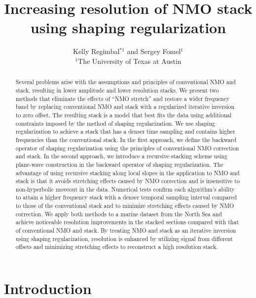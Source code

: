 \title{Increasing resolution of NMO stack using shaping regularization}
\author{Kelly Regimbal$^{*1}$ and Sergey Fomel$^{1}$
\\
$^1$The University of Texas at Austin}

\maketitle


\begin{abstract}
Several problems arise with the assumptions and principles of
conventional NMO and stack, resulting in lower amplitude and lower resolution stacks. We present two methods 
that eliminate the effects of ``NMO stretch'' and restore a wider frequency band by replacing conventional 
NMO and stack with a regularized iterative inversion to zero offset. The resulting stack is a model that 
best fits the data using additional constraints imposed by the method of shaping 
regularization. We use shaping regularization to achieve a 
stack that has a denser time sampling and contains higher frequencies than the conventional 
stack. In the first approach, we define the backward operator of shaping regularization
using the principles of conventional NMO correction and stack. In the second approach, we introduce a recursive 
stacking scheme using plane-wave construction in the backward operator of shaping regularization. The advantage of 
using recursive stacking along local 
slopes in the application to NMO and stack is that it avoids stretching effects caused by NMO correction and is insensitive to non-hyperbolic moveout in the data. Numerical tests confirm each algorithm's ability to attain a higher frequency stack with a denser temporal sampling interval compared to those of the conventional stack and to minimize stretching effects caused by NMO correction. We apply both methods to a marine dataset from the North Sea and achieve noticeable resolution improvements in the stacked sections compared with that of conventional NMO and stack. By treating NMO and stack
as an iterative inversion using shaping regularization, resolution is enhanced by utilizing signal from different offsets and
minimizing stretching effects to reconstruct a high resolution stack.
\end{abstract}

\section{Introduction}

